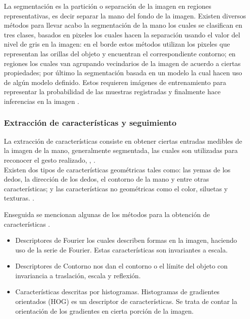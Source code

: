 La segmentación es la partición o separación de la imagen en regiones representativas, es decir separar la mano del fondo de la imagen. Existen diversos métodos para llevar acabo la segmentación de la mano los cuales se clasifican en tres clases, basados en pixeles los cuales hacen la separación usando el valor del nivel de gris en la imagen: en el borde estos métodos utilizan los pixeles que representan las orillas del objeto y encuentran el correspondiente contorno; en regiones los cuales van agrupando vecindarios de la imagen de acuerdo a ciertas propiedades; por último la segmentación basada en un modelo la cual hacen uso de algún modelo definido. Estos requieren imágenes de entrenamiento para representar la probabilidad de las muestras registradas y finalmente hace inferencias en la imagen \citep{Ibraheem2013}.

\subsubsection{Extracción de características y seguimiento}\label{sssec:EtapaSeguimiento}  

La extracción de características consiste en obtener ciertas entradas medibles de la imagen de la mano, generalmente segmentada, las cuales son utilizadas para reconocer el gesto realizado, \citep{Premaratne2013}, \citep{Nayakwadi2014}.\\
Existen dos tipos de características geométricas tales como: las yemas de los dedos, la dirección de los dedos, el contorno de la mano y entre otras características; y las características no geométricas como el color, siluetas y texturas. \citep{Murthy2009}. 

Enseguida se mencionan algunas de los métodos para la obtención de características \citep{Premaratne2013}. 
\begin{itemize}
\item Descriptores de Fourier los cuales describen formas en la imagen, haciendo uso de la serie de Fourier. Estas características son invariantes a escala.
\item Descriptores de Contorno nos dan el contorno  o el límite del objeto con invariancia a traslación, escala  y reflexión.     
\item Características descritas por histogramas. Histogramas de gradientes orientados (HOG) es un descriptor de características. Se trata de contar la orientación de los gradientes en cierta porción de la imagen.  
\end{itemize}


